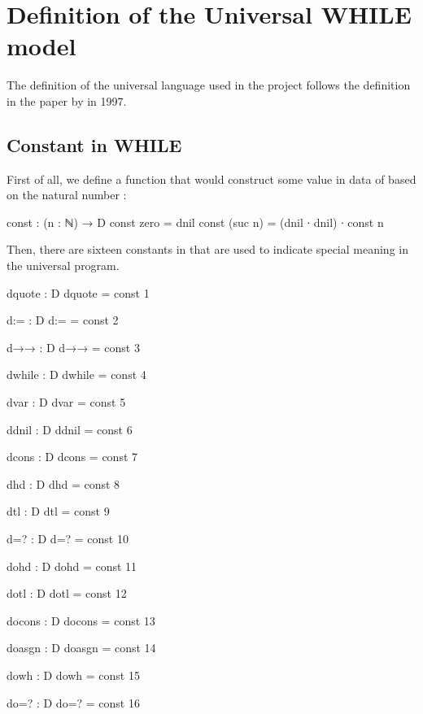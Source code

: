 \chapter{Definition of the Universal WHILE model}
The definition of the universal \WHILE language used in the project follows the definition in the paper  by  in 1997\cite{jones_computability_1997}.
\section{Constant in WHILE}\label{appendix:const of d}
First of all, we define a function that would construct some value in data of  based on the natural number :
\begin{code}
const : (n : ℕ) → D
const zero = dnil
const (suc n) = (dnil ∙ dnil) ∙ const n
\end{code}
Then, there are sixteen constants in  that are used to indicate special meaning in the universal \WHILE program.
\begin{code}[fontsize=\footnotesize]
dquote : D
dquote = const 1

d:= : D
d:= = const 2

d→→ : D
d→→ = const 3

dwhile : D
dwhile = const 4

dvar : D
dvar =  const 5

ddnil : D
ddnil = const 6

dcons : D
dcons = const 7

dhd : D
dhd = const 8

dtl : D
dtl = const 9

d=? : D
d=? = const 10

dohd : D
dohd = const 11

dotl : D
dotl = const 12

docons : D
docons = const 13

doasgn : D
doasgn = const 14

dowh : D
dowh = const 15

do=? : D
do=? = const 16
\end{code}
